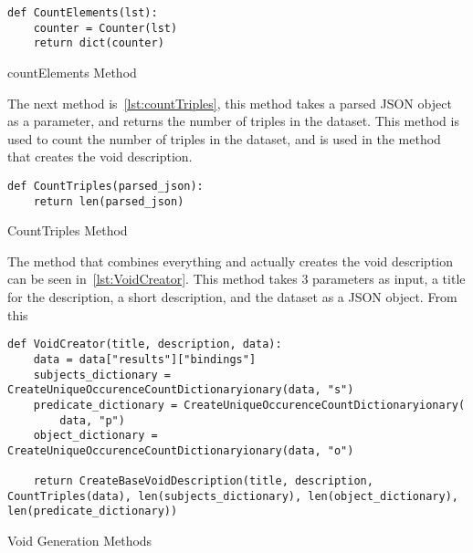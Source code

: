 \begin{listing}[htb!]
    \begin{verbatim}
def CountElements(lst):
    counter = Counter(lst)
    return dict(counter)
    \end{verbatim}
    \caption{countElements Method}
    \label{lst:countElements}
\end{listing}

The next method is~\ref{lst:countTriples}, this method takes a parsed JSON object as a parameter, and returns the number of triples in the dataset. This method is used to count the number of triples in the dataset, and is used in the method that creates the void description.

\begin{listing}[htb!]
    \begin{verbatim}
def CountTriples(parsed_json):
    return len(parsed_json)
    \end{verbatim}
    \caption{CountTriples Method}
    \label{lst:countTriples}
\end{listing}

The method that combines everything and actually creates the \gls{void} description can be seen in~\ref{lst:VoidCreator}. This method takes 3 parameters as input, a title for the description, a short description, and the dataset as a JSON object. From this

\begin{listing}[htb!]
    \begin{verbatim}
def VoidCreator(title, description, data):
    data = data["results"]["bindings"]
    subjects_dictionary = CreateUniqueOccurenceCountDictionaryionary(data, "s")
    predicate_dictionary = CreateUniqueOccurenceCountDictionaryionary(
        data, "p")
    object_dictionary = CreateUniqueOccurenceCountDictionaryionary(data, "o")
    
    return CreateBaseVoidDescription(title, description, CountTriples(data), len(subjects_dictionary), len(object_dictionary), len(predicate_dictionary))
    \end{verbatim}
    \caption{Void Generation Methods}
    \label{lst:VoidCreator}
\end{listing}



